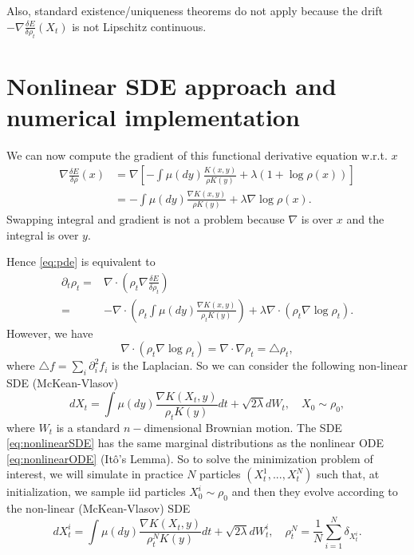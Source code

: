 \documentclass[a4paper]{article}
\theoremstyle{definition}
\newcommand{\variation}[1]{\ensuremath{\frac{\delta E}{\delta #1}}}
\begin{document}
Also, standard existence/uniqueness theorems do not apply because the drift $-\nabla\frac{\delta E}{\delta\rho_{t}}\left(X_{t}\right)$ is not Lipschitz continuous.

\section{Nonlinear SDE approach and numerical implementation}

We can now compute the gradient of this functional derivative equation w.r.t. $x$
\begin{align*}
\nabla\frac{\delta E}{\delta\rho}\left(x\right) & = \nabla\left[-\int\mu\left(dy\right)\frac{ K(x,y)}{\rho K(y)}+\lambda(1 + \log\rho\left(x\right))\right]\\
&= -\int\mu\left(dy\right)\frac{\nabla K(x,y)}{\rho K(y)}+\lambda\nabla\log\rho\left(x\right).
\end{align*}
Swapping integral and gradient is not a problem because $\nabla$ is over $x$ and the integral is over $y$.

Hence \eqref{eq:pde} is equivalent to
\begin{align*}
\partial_{t}\rho_{t}= & \nabla\cdot\left(\rho_{t}\nabla\variation{\rho_{t}}\right)\\
= & -\nabla\cdot\left(\rho_{t}\int\mu\left(dy\right)\frac{\nabla K(x,y)}{\rho_{t}K(y)}\right)+\lambda\nabla\cdot\left(\rho_{t}\nabla\log\rho_{t}\right).
\end{align*}
However, we have
\[
\nabla\cdot\left(\rho_{t}\nabla\log\rho_{t}\right)=\nabla\cdot\nabla\rho_{t}=\triangle\rho_{t},
\]
where $\triangle f=\sum_{i}\partial_{i}^{2}f_{i}$ is the Laplacian.
So we can consider the following non-linear SDE (McKean-Vlasov) 
\begin{equation}
dX_{t}=\int\mu\left(dy\right)\frac{\nabla K(X_{t},y)}{\rho_{t}K(y)}dt+\sqrt{2\lambda}dW_{t},\quad X_{0}\sim\rho_{0},\label{eq:nonlinearSDE}
\end{equation}
where $W_{t}$ is a standard $n-$dimensional Brownian motion.
The SDE \eqref{eq:nonlinearSDE} has the same marginal distributions as the nonlinear ODE \eqref{eq:nonlinearODE} (It\^o's Lemma).
So to solve the minimization problem of interest, we will simulate in practice $N$ particles $(X_{t}^{1},...,X_{t}^{N})$ such that, at initialization, we sample iid particles $X_{0}^{i}\sim\rho_{0}$ and then they evolve according to the non-linear (McKean-Vlasov) SDE
\[
dX_{t}^{i}=\int\mu\left(dy\right)\frac{\nabla K(X_{t},y)}{\rho_{t}^{N}K(y)}dt+\sqrt{2\lambda}dW_{t}^{i},\quad\rho_{t}^{N}=\frac{1}{N}\sum_{i=1}^{N}\delta_{X_{t}^{i}}.
\]
\end{document}
